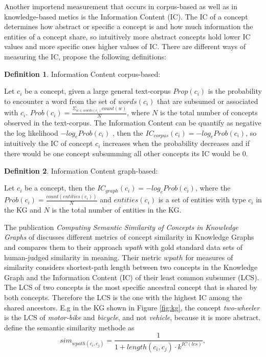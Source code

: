 \documentclass[pdftex,a4paper,12pt]{scrartcl}
\theoremstyle{definition}
\newtheorem{definition}{Definition}[section]
\begin{document}
Another importend measurement that occurs in corpus-based as well as in knowledge-based metics is the Information Content (IC). The IC of a concept determines how abstract or specific a concept is and how much information the entities of a concept share, so intuitively more abstract concepts hold lower IC values and more specific ones higher values of IC. There are different ways of measuring the IC, \citet{zhu_computing_2017} propose the following definitions: 
\begin{definition}{Information Content corpus-based:}

Let $c_i$ be a concept, given a large general text-corpus $Prop(c_i)$ is the probability to encounter a word from the set of $words(c_i)$ that are subsumed or associated with $c_i$. $Prob(c_i)= \frac{\Sigma_{w\in words(c_i)} count(w)}{N}$, where $N$ is the total number of concepts observed in the text-corpus. The Information Content can be quantify as negative the log likelihood $-log_e Prob(c_i)$ \citep{resnik_using_nodate}, then the $IC_{corpus}(c_i) = -log_e Prob(c_i)$, so intuitively the IC of concept $c_i$ increases when the probability decreases and if there would be one concept subsumming all other concepts its IC would be $0$. 
\end{definition}
\begin{definition}{Information Content graph-based:}

Let $c_i$ be a concept, then the $IC_{graph}(c_i) = -log_e Prob(c_i)$, where the $Prob(c_i) = \frac{count(entities(c_i))}{N}$ and $entities(c_i)$ is a set of entities with type $c_i$ in the KG and $N$ is the total number of entities in the KG. 
\end{definition}


The publication \textit{Computing  Semantic  Similarity of  Concepts in Knowledge Graphs} of \citet{zhu_computing_2017} discusses different metrics of concept similarity in Knowledge Graphs and compares them to their approach \textit{wpath} with gold standard data sets of human-judged similarity in meaning. Their metric $wpath$ for measures of similarity considers shortest-path length between two concepts in the Knowledge Graph and the Information Content (IC) of their least common subsumer (LCS). The LCS of two concepts is the most specific ancestral concept that is shared by both concepts. Therefore the LCS is the one with the highest IC among the shared ancestors. E.g in the KG shown in Figure \ref{fig:kg}, the concept \textit{two-wheeler} is the LCS of \textit{motor-bike} and \textit{bicycle}, and not \textit{vehicle}, because it is more abstract. \citep{zhu_computing_2017} define the semantic similarity methode as 
\begin{equation}
    sim_{wpath(c_i,c_j)} = \frac{1}{1+length(c_i,c_j) \cdot k^{IC(lcs)}},
\end{equation}
\end{document}
